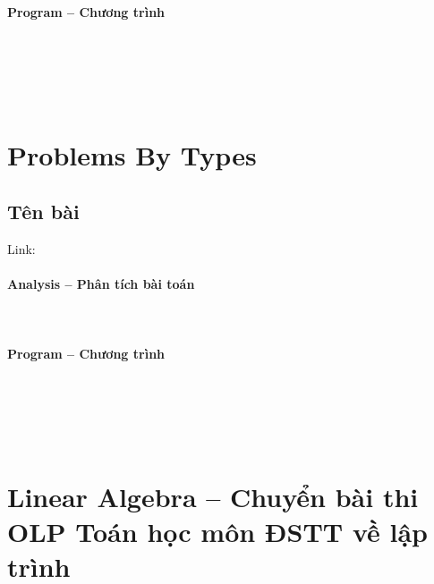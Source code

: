 \documentclass{article}
\begin{document}
\paragraph{Program -- Chương trình} \mbox{} \\


\begin{lstlisting}

	
\end{lstlisting}

\section{Problems By Types}

\subsection{Tên bài}
Link: \url{}
 

\paragraph{Analysis -- Phân tích bài toán} \mbox{} \\


\paragraph{Program -- Chương trình} \mbox{} \\


\begin{lstlisting}

	
\end{lstlisting}


\section{Linear Algebra -- Chuyển bài thi OLP Toán học môn ĐSTT về lập trình}
\end{document}
